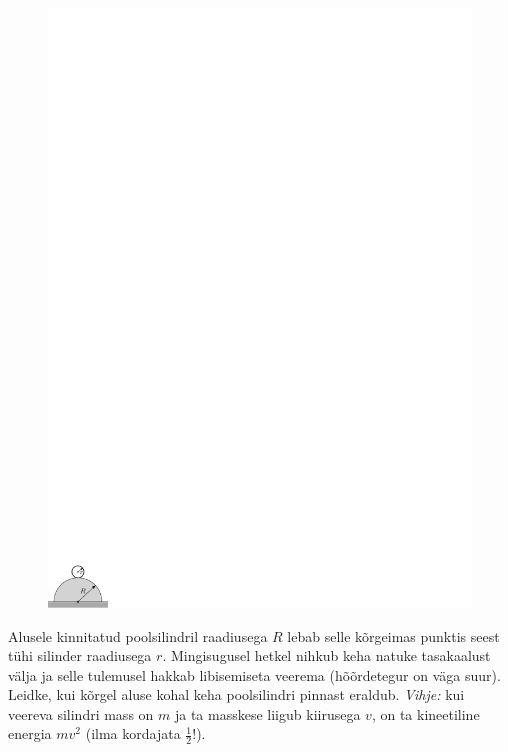 \documentclass[10pt]{article}
\begin{document}
{
\begin{figure}
	\vspace{-10pt}
	\hspace{-8pt}
	\includegraphics[width=\linewidth]{2010-lahg-03-silindri_joonis_ipe}
\end{figure}

Alusele kinnitatud poolsilindril raadiusega $R$
lebab selle kõrgeimas punktis seest tühi silinder
raadiusega $r$. Mingisugusel hetkel nihkub keha natuke tasakaalust välja ja
selle tulemusel hakkab libisemiseta veerema (hõõrdetegur on väga suur). Leidke, kui kõrgel aluse kohal keha
poolsilindri pinnast eraldub. \emph{Vihje:} kui veereva silindri mass on $m$ ja
ta masskese liigub kiirusega $v$, on ta kineetiline energia $m v^2$ (ilma
kordajata $\frac12$!).
\probend
\bigskip


}
\end{document}
